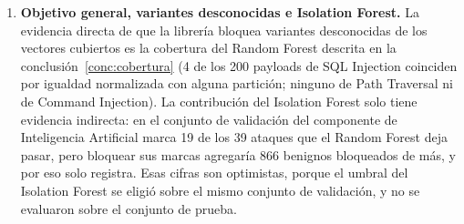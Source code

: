 \begin{enumerate}
    \item \textbf{Objetivo general, variantes desconocidas e Isolation Forest.}\label{conc:variantes}
    La evidencia directa de que la librería bloquea variantes desconocidas de los vectores cubiertos
    es la cobertura del Random Forest descrita en la conclusión~\ref{conc:cobertura} (4 de los 200 payloads de SQL
    Injection coinciden por igualdad normalizada con alguna partición; ninguno de Path Traversal ni
    de Command Injection). La contribución del Isolation Forest solo tiene evidencia indirecta: en
    el conjunto de validación del componente de Inteligencia Artificial \cite{valenzuela2026ia} marca 19 de los 39 ataques
    que el Random Forest deja pasar, pero bloquear sus marcas agregaría 866 benignos bloqueados de
    más, y por eso solo registra. Esas cifras son optimistas, porque el umbral del Isolation Forest
    se eligió sobre el mismo conjunto de validación, y no se evaluaron sobre el conjunto de prueba.


\end{enumerate}
